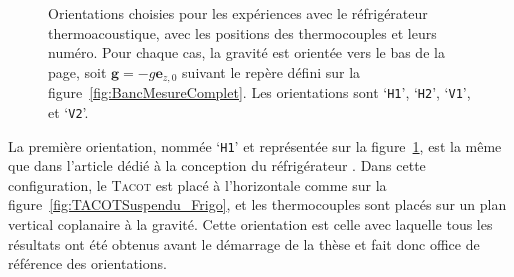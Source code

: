 \begin{figure}[!htp]
	\centering		
	\begin{subfigure}[c]{.4\textwidth}
		\centering
		
		\caption{}
		\label{fig:OrientationCore_H1}
	\end{subfigure} 
	\begin{subfigure}[c]{.4\textwidth}
		\centering
		
		\caption{}
		\label{fig:OrientationCore_H2}
	\end{subfigure} 

	\vspace{1cm}
	
	\begin{subfigure}[c]{.4\textwidth}
		\centering
		
		\caption{}
		\label{fig:OrientationCore_V1}
	\end{subfigure} 
	\begin{subfigure}[c]{.4\textwidth}
		\centering
		
		\caption{}
		\label{fig:OrientationCore_V2}
	\end{subfigure}  	
 	\caption{Orientations choisies pour les expériences avec le réfrigérateur thermoacoustique, avec les positions des thermocouples et leurs numéro. Pour chaque cas, la gravité est orientée vers le bas de la page, soit $\mathbf g=-g\mathbf e_{z,0}$ suivant le repère défini sur la figure~\ref{fig:BancMesureComplet}. Les orientations sont   `\texttt{H1}',  `\texttt{H2}',   `\texttt{V1}', et   `\texttt{V2}'.}%
    \label{fig:OrientationCore} %
\end{figure}


La première orientation, nommée `\texttt{H1}' et représentée sur la figure~\ref{fig:OrientationCore_H1}, est la même que dans l'article dédié à la conception du réfrigérateur \cite{ramadan_design_2021}. Dans cette configuration, le \textsc{Tacot} est placé à l'horizontale comme sur la figure~\ref{fig:TACOTSuspendu_Frigo}, et les thermocouples sont placés sur un plan vertical coplanaire à la gravité. Cette orientation est celle avec laquelle tous les résultats ont été obtenus avant le démarrage de la thèse et fait donc office de référence des orientations.\smallskip

